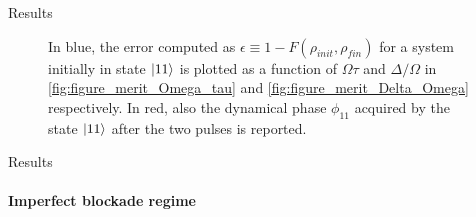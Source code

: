 \documentclass[8pt]{beamer}
\begin{document}
\begin{frame}{Results}
\begin{figure}[H]
\begin{minipage}[]{0.49\linewidth}
        \end{minipage}
        \caption{In blue, the error computed as $ \epsilon \equiv 1 - F(\rho_{init},\rho_{fin})$ for a system initially in state $\ket{11}$ is plotted as a function of $\Omega\tau$ and $\Delta/\Omega$ in \ref{fig:figure_merit_Omega_tau} and \ref{fig:figure_merit_Delta_Omega} respectively.  In red, also the dynamical phase $\phi_{11}$ acquired by the state $\ket{11}$ after the two pulses is reported. }
        \label{fig:figure_merit}
        \end{figure}
    \end{frame}
    
 	\begin{frame}{Results}
	\framesubtitle{Imperfect blockade regime}  
        \begin{figure}[H]
        \begin{minipage}[c]{0.49\linewidth}
        \end{minipage}
        \begin{minipage}[]{0.49\linewidth} \vspace{0.5cm}
        \centering

\end{minipage}
\end{figure}
\end{frame}
\end{document}
